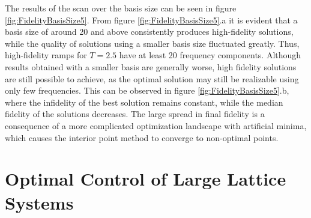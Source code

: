The results of the scan over the basis size can be seen in figure \ref{fig:FidelityBasisSize5}. From figure \ref{fig:FidelityBasisSize5}.a it is evident that a basis size of around 20 and above consistently produces high-fidelity solutions, while the quality of solutions using a smaller basis size fluctuated greatly. Thus, high-fidelity ramps for $T = 2.5$ have at least 20 frequency components. Although results obtained with a smaller basis are generally worse, high fidelity solutions are still possible to achieve, as the optimal solution may still be realizable using only few frequencies. This can be observed in figure \ref{fig:FidelityBasisSize5}.b, where the infidelity of the best solution remains constant, while the median fidelity of the solutions decreases. The large spread in final fidelity is a consequence of a more complicated optimization landscape with artificial minima, which causes the interior point method to converge to non-optimal points.


\section{Optimal Control of Large Lattice Systems} \label{sec:20partOptimization}